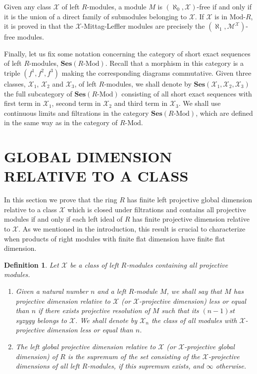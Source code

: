 \documentclass[a4paper,10pt]{amsart}
\newtheorem{definition}{Definition}[section]
\begin{document}
Given any class $\mathcal X$ of left $R$-modules, a module $M$ is
$(\aleph_0,\mathcal X)$-free if and only if it is the union of a
direct family of submodules belonging to $\mathcal X$. If $\mathcal
X$ is in ${\textrm{Mod-}R}$, it is proved in \cite[Theorem 2.6]{HerberaTrlifaj} that
the $\mathcal X$-Mittag-Leffler modules are precisely the
$(\aleph_1,\mathcal M^{\mathcal X})$-free modules.

Finally, let us fix some notation concerning the category of short
exact sequences of left $R$-modules, $\mathbf{Ses}({R\textrm{-Mod}})$. Recall
that a morphism in this category is a triple $(f^1,f^2,f^3)$ making
the corresponding diagrams commutative. Given three classes, $\mathcal
X_1$, $\mathcal X_2$ and $\mathcal X_3$, of left $R$-modules, we shall
denote by $\textbf{Ses}(\mathcal X_1,\mathcal X_2,\mathcal X_3)$ the
full subcategory of $\textbf{Ses}({R\textrm{-Mod}})$ consisting of all short
exact sequences with first term in $\mathcal X_1$, second term in
$\mathcal X_2$ and third term in $\mathcal X_3$. We shall use
continuous limits and filtrations in the category
$\textbf{Ses}({R\textrm{-Mod}})$, which are defined in the same way as in the
category of ${R\textrm{-Mod}}$.

\section{GLOBAL DIMENSION RELATIVE TO A CLASS}
\label{sec:glob-dimens-relat}

In this section we prove that the ring $R$ has finite left projective
global dimension relative to a class $\mathcal X$ which is closed
under filtrations and contains all projective modules if and only if
each left ideal of $R$ has finite projective dimension relative to
$\mathcal X$. As we mentioned in the introduction, this result is
crucial to characterize when products of right modules with finite flat
dimension have finite flat dimension.

\begin{definition}
  Let $\mathcal X$ be a class of left $R$-modules containing all
  projective modules.
  \begin{enumerate}
  \item Given a natural number $n$ and a left $R$-module $M$, we shall
    say that $M$ has projective dimension relative to $\mathcal X$ (or
    $\mathcal X$-projective dimension) less or equal than $n$ if there
    exists projective resolution of $M$ such that its $(n-1)st$ syzygy
    belongs to $\mathcal X$. We shall denote by $\mathcal X_n$ the
    class of all modules with $\mathcal X$-projective dimension less
    or equal than $n$.

  \item The left global projective dimension relative to $\mathcal X$
    (or $\mathcal X$-projective global dimension) of $R$ is the
    supremum of the set consisting of the $\mathcal X$-projective
    dimensions of all left $R$-modules, if this supremum exists, and
    $\infty$ otherwise.
  \end{enumerate}
\end{definition}
\end{document}
